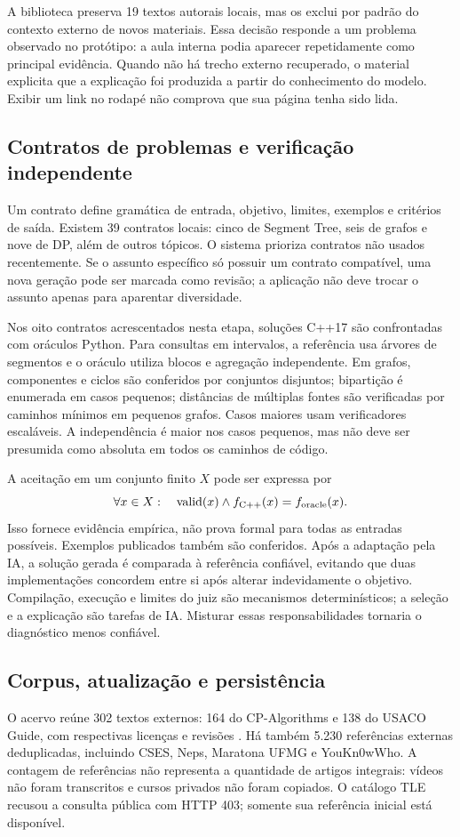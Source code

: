 \documentclass[12pt]{article}
\begin{document}
A biblioteca preserva 19 textos autorais locais, mas os exclui por padrão do contexto externo de novos materiais. Essa decisão responde a um problema observado no protótipo: a aula interna podia aparecer repetidamente como principal evidência. Quando não há trecho externo recuperado, o material explicita que a explicação foi produzida a partir do conhecimento do modelo. Exibir um link no rodapé não comprova que sua página tenha sido lida.

\subsection{Contratos de problemas e verificação independente}
Um contrato define gramática de entrada, objetivo, limites, exemplos e critérios de saída. Existem 39 contratos locais: cinco de Segment Tree, seis de grafos e nove de DP, além de outros tópicos. O sistema prioriza contratos não usados recentemente. Se o assunto específico só possuir um contrato compatível, uma nova geração pode ser marcada como revisão; a aplicação não deve trocar o assunto apenas para aparentar diversidade.

Nos oito contratos acrescentados nesta etapa, soluções C++17 são confrontadas com oráculos Python. Para consultas em intervalos, a referência usa árvores de segmentos e o oráculo utiliza blocos e agregação independente. Em grafos, componentes e ciclos são conferidos por conjuntos disjuntos; bipartição é enumerada em casos pequenos; distâncias de múltiplas fontes são verificadas por caminhos mínimos em pequenos grafos. Casos maiores usam verificadores escaláveis. A independência é maior nos casos pequenos, mas não deve ser presumida como absoluta em todos os caminhos de código.

A aceitação em um conjunto finito $X$ pode ser expressa por
\begin{equation}
 \forall x\in X:\quad \operatorname{valid}(x)\land f_{\rm C++}(x)=f_{\rm oracle}(x).
\end{equation}
Isso fornece evidência empírica, não prova formal para todas as entradas possíveis. Exemplos publicados também são conferidos. Após a adaptação pela IA, a solução gerada é comparada à referência confiável, evitando que duas implementações concordem entre si após alterar indevidamente o objetivo. Compilação, execução e limites do juiz são mecanismos determinísticos; a seleção e a explicação são tarefas de IA. Misturar essas responsabilidades tornaria o diagnóstico menos confiável.

\subsection{Corpus, atualização e persistência}
O acervo reúne 302 textos externos: 164 do CP-Algorithms e 138 do USACO Guide, com respectivas licenças e revisões \cite{cpalgorithms2026,usaco2026}. Há também 5.230 referências externas deduplicadas, incluindo CSES, Neps, Maratona UFMG e YouKn0wWho. A contagem de referências não representa a quantidade de artigos integrais: vídeos não foram transcritos e cursos privados não foram copiados. O catálogo TLE recusou a consulta pública com HTTP 403; somente sua referência inicial está disponível.
\end{document}
